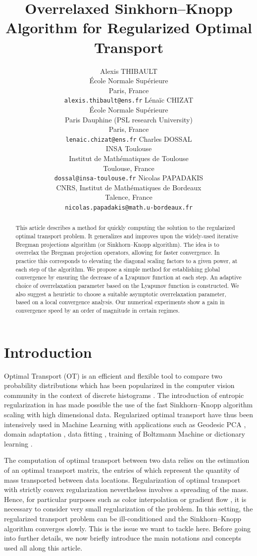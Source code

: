 \documentclass{article} %
\title{Overrelaxed Sinkhorn--Knopp Algorithm for Regularized Optimal Transport}
\author{
Alexis THIBAULT\\
\'Ecole Normale Sup\'erieure\\
Paris, France\\
\texttt{alexis.thibault@ens.fr}
 \And
L\'ena\"ic CHIZAT\\
\'Ecole Normale Sup\'erieure\\ Paris Dauphine (PSL research University)\\
Paris, France\\
\texttt{lenaic.chizat@ens.fr}
 \AND
Charles DOSSAL\\
INSA Toulouse\\
Institut de Math\'ematiques de Toulouse\\
Toulouse,  France\\
\texttt{dossal@insa-toulouse.fr}
\And 
Nicolas PAPADAKIS\\
CNRS, Institut de Math\'ematiques de Bordeaux\\
Talence, France\\
\texttt{nicolas.papadakis@math.u-bordeaux.fr}
}
\theoremstyle{plain}
\theoremstyle{definition}
\theoremstyle{remark}
\begin{document}
\maketitle

\begin{abstract}
This article describes a method for quickly computing the solution to the regularized optimal transport problem. It generalizes and improves upon the widely-used iterative Bregman projections algorithm (or Sinkhorn--Knopp algorithm). 
The idea is to overrelax the Bregman projection operators, allowing for faster convergence. In practice this corresponds to elevating the diagonal scaling factors to a given power, at each step of the algorithm.
We propose a simple method for establishing global convergence by ensuring the decrease of a Lyapunov function at each step.
An adaptive choice of overrelaxation parameter based on the Lyapunov function is constructed.
We also suggest a heuristic to choose a suitable asymptotic overrelaxation parameter, based on a local convergence analysis. Our numerical experiments show a gain in convergence speed by an order of magnitude in certain regimes.
\end{abstract}

\section{Introduction}
Optimal Transport (OT) is an efficient and flexible tool to compare two probability distributions which has been popularized in the computer vision community in the context of discrete histograms \cite{Rubner2000}. The introduction of entropic regularization in \cite{cuturi13} has made possible the use of the fast Sinkhorn--Knopp algorithm \cite{sinkhorn64}   scaling with high dimensional data. 
Regularized optimal transport have thus been intensively used  in  Machine Learning with applications such as   Geodesic PCA \cite{seguy2015principal}, domain adaptation \cite{2015arXiv150700504C}, data fitting \cite{2015arXiv150605439F},  training of Boltzmann Machine \cite{NIPS2016_6248}  or dictionary learning \cite{Rolet2016,2017arXiv170801955S}.

The computation of optimal transport between two data relies on the estimation of an optimal transport matrix, the entries of which represent the quantity of mass transported between  data locations. 
Regularization of optimal transport with strictly convex regularization \cite{cuturi13, dessein2016}  nevertheless involves a spreading of the mass. Hence, for particular purposes such as color interpolation \cite{Rabin2014} or gradient flow \cite{2016arXiv160705816C}, it is  necessary  to consider very small regularization of the problem.
In this setting,  the regularized transport problem can be ill-conditioned and the Sinkhorn--Knopp algorithm converges slowly. This is the issue  we want to tackle here.
Before going into further details, we now briefly introduce the main notations and concepts used all along this article.
\end{document}
